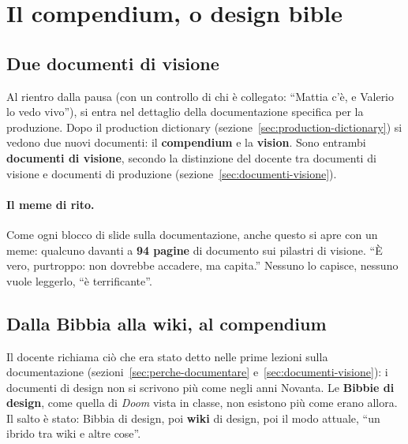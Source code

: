 \section{Il compendium, o design bible}
\label{gd9:sec:compendium}



\subsection{Due documenti di visione}

Al rientro dalla pausa (con un controllo di chi è collegato: ``Mattia c'è, e
Valerio lo vedo vivo''), si entra nel dettaglio della documentazione
specifica per la produzione. Dopo il production dictionary
(sezione~\ref{sec:production-dictionary}) si vedono due nuovi documenti: il
\textbf{compendium} e la \textbf{vision}. Sono entrambi \textbf{documenti di
visione}, secondo la distinzione del docente tra documenti di visione e
documenti di produzione (sezione~\ref{sec:documenti-visione}).

\paragraph{Il meme di rito.} Come ogni blocco di slide sulla documentazione,
anche questo si apre con un meme: qualcuno davanti a \textbf{94 pagine} di
documento sui pilastri di visione. ``È vero, purtroppo: non dovrebbe
accadere, ma capita.'' Nessuno lo capisce, nessuno vuole leggerlo, ``è
terrificante''.

\subsection{Dalla Bibbia alla wiki, al compendium}

Il docente richiama ciò che era stato detto nelle prime lezioni sulla
documentazione (sezioni~\ref{sec:perche-documentare}
e~\ref{sec:documenti-visione}): i documenti di design non si scrivono più come
negli anni Novanta. Le \textbf{Bibbie di design}, come quella di
\emph{Doom} vista in classe, non esistono più come erano allora. Il salto è
stato: Bibbia di design, poi \textbf{wiki} di design, poi il modo attuale,
``un ibrido tra wiki e altre cose''.

